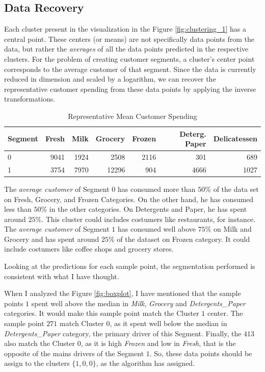 \documentclass[a4paper]{article}
\begin{document}
\subsection{Data Recovery}

Each cluster present in the visualization in the Figure \ref{fig:clustering_1} has a central point. These centers (or means) are not specifically data points from the data, but rather the \textit{averages} of all the data points predicted in the respective clusters. For the problem of creating customer segments, a cluster's center point corresponds to the average customer of that segment. Since the data is currently reduced in dimension and scaled by a logarithm, we can recover the representative customer spending from these data points by applying the inverse transformations.


\begin{table}[ht!]
\centering
\begin{tabular}{l|rrrrrr}
{Segment} &  Fresh &  Milk &  Grocery &  Frozen &  Deterg. Paper &  Delicatessen \\\hline
0 &   9041 &  1924 &     2508 &    2116 &               301 &           689 \\
1 &   3754 &  7970 &    12296 &     904 &              4666 &          1027 \\

\end{tabular}
\caption{\label{tab:centrois_Recov}Representative Mean Customer Spending}
\end{table}

The \textit{average customer} of Segment $0$ has consumed more than $50\%$ of the data set on Fresh, Grocery, and Frozen Categories. On the other hand, he has consumed less than $50\%$ in the other categories. On Detergents and Paper, he has spent around $25\%$. This cluster could includes costumers like restaurants, for instance. The \textit{average customer} of Segment $1$ has consumed well above $75\%$ on Milk and Grocery and has spent around $25\%$ of the dataset on Frozen category. It could include costumers like coffee shops and grocery stores.

Looking at the predictions for each sample point, the segmentation performed is consistent with what I have thought. 

When I analyzed the Figure \ref{fig:boxplot}, I have mentioned that the sample points $1$ spent well above the median in \textit{Milk}, \textit{Grocery} and \textit{Detergents\_Paper} categories. It would make this sample point match the Cluster $1$ center. The sample point $271$ match Cluster $0$, as it spent well below the median in \textit{Detergents\_Paper} category, the primary driver of this Segment. Finally, the $413$ also match the Cluster $0$, as it is high \textit{Frozen} and low in \textit{Fresh}, that is the opposite of the mains drivers of the Segment $1$. So, these data points should be assign to the clusters $\{ 1, 0, 0\}$, as the algorithm has assigned.
\end{document}
